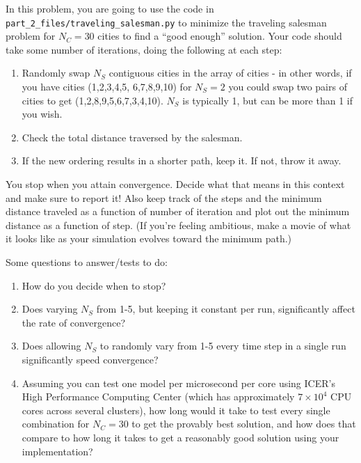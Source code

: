 \documentclass[10pt]{article}
\begin{document}
In this problem, you are going to use the code in
\texttt{part\_2\_files/traveling\_salesman.py} to minimize the traveling salesman
problem for $N_C = 30$ cities to find a ``good enough'' solution.  
Your code should take some number of
iterations, doing the following at each step:

\begin{enumerate}
\item Randomly swap $N_S$ contiguous cities in the array of cities - in other words, if you have cities
  (1,2,3,4,5, 6,7,8,9,10) for $N_S=2$ you could swap two pairs of cities
  to get (1,2,8,9,5,6,7,3,4,10).  $N_S$ is typically 1, but can be more than 1
  if you wish.
\item Check the total distance traversed by the salesman.
\item If the new ordering results in a shorter path, keep it.  If not, throw it away.
\end{enumerate}

You stop when you attain convergence.  Decide what that means in this
context and make sure to report it!  Also keep track of the steps and
the minimum distance traveled as a function of number of iteration and
plot out the minimum distance as a function of step. (If you're
feeling ambitious, make a movie of what it looks like as your
simulation evolves toward the minimum path.)

Some questions to answer/tests to do:

\begin{enumerate}

\item How do you decide when to stop?  

\item Does varying $N_S$ from 1-5, but keeping it constant per run,
  significantly affect the rate of convergence?

\item Does allowing $N_S$ to randomly vary from 1-5 every time step in
  a single run significantly speed convergence? 

\item Assuming you can test one model per microsecond 
  per core using ICER's High Performance Computing Center (which has approximately
  $7 \times 10^4$ CPU cores across several clusters), how long would it take to test
  every single combination for $N_C = 30$ to get the provably best solution, and how does that compare
  to how long it takes to get a reasonably good solution using your implementation?

\end{enumerate}
\end{document}
